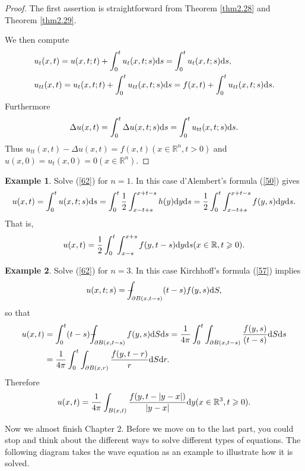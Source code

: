 \documentclass[hyperref,UTF8,12pt]{article}
\numberwithin{equation}{subsection}
\theoremstyle{plain}
\theoremstyle{definition}
\newtheorem{example}{Example}
\numberwithin{theorem}{section}
\numberwithin{lemma}{section}
\numberwithin{proposition}{section}
\numberwithin{remark}{section}
\numberwithin{corollary}{section}
\numberwithin{definition}{section}
\numberwithin{problem}{section}
\numberwithin{example}{section}
\def\dif{\textup{d}}
\def\Xint#1{\mathchoice
	{\XXint\displaystyle\textstyle{#1}}%
	{\XXint\textstyle\scriptstyle{#1}}%
	{\XXint\scriptstyle\scriptscriptstyle{#1}}%
	{\XXint\scriptscriptstyle\scriptscriptstyle{#1}}%
	\!\int}
\def\XXint#1#2#3{{\setbox0=\hbox{$#1{#2#3}{\int}$ }
		\vcenter{\hbox{$#2#3$ }}\kern-.55\wd0}}
\def\dashint{\Xint-}
\newcommand{\ptl}{\partial}
\newcommand{\mr}{\mathbb{R}}
\renewcommand{\geq}{\geqslant}
\begin{document}
\begin{proof}
The first assertion is straightforward from Theorem \ref{thm2.28} and Theorem \ref{thm2.29}.

We then compute\[\begin{aligned}
	&u_t(x,t)=u(x,t;t)+\int_0^tu_t(x,t;s)\dif s=\int_0^tu_t(x,t;s)\dif s,\\
	&u_{tt}(x,t)=u_t(x,t;t)+\int_0^tu_{tt}(x,t;s)\dif s=f(x,t)+\int_0^tu_{tt}(x,t;s)\dif s.
\end{aligned}\]Furthermore
\[\Delta u(x,t)=\int_0^t\Delta u(x,t;s)\dif s=\int_0^tu_{tt}(x,t;s)\dif s.\]Thus
$u_{tt}(x,t)-\Delta u(x,t)=f(x,t)(x\in\mr^n,t>0)$ and $u(x,0)=u_t(x,0)=0(x\in\mr^n)$.
\end{proof}
\begin{example}
Solve (\ref{62}) for $n=1$. In this case d'Alembert's formula (\ref{50}) gives \[u(x,t)=\int_0^tu(x,t;s)\dif s=\int_0^t\frac{1}{2}\int_{x-t+s}^{x+t-s}h(y)\dif y\dif s=\frac{1}{2}\int_0^t\int_{x-t+s}^{x+t-s}f(y,s)\dif y\dif s.\]That is, \[u(x,t)=
\frac{1}{2}\int_0^t\int_{x-s}^{x+s}f(y,t-s)\dif y\dif s(x\in\mr,t\geq0).\]
\end{example}
\begin{example}
Solve (\ref{62}) for $n=3$. In this case Kirchhoff's formula (\ref{57}) implies \[u(x,t;s)=
\dashint_{\ptl B(x,t-s)}(t-s)f(y,s)\dif S,\]so that \[\begin{aligned}
	u(x,t)&=\int_0^t(t-s)\dashint_{\ptl B(x,t-s)}f(y,s)\dif S\dif s=\frac{1}{4\pi}\int_0^t\int_{\ptl B(x,t-s)}\frac{f(y,s)}{(t-s)}\dif S\dif s\\
	&=\frac{1}{4\pi}\int_0^t\int_{\ptl B(x,r)}\frac{f(y,t-r)}{r}\dif S\dif r.
\end{aligned}\]Therefore\[u(x,t)=\frac{1}{4 \pi}\int_{B(x,t)}\frac{f(y,t-|y-x|)}{|y-x|}\dif y
(x\in\mr^3,t\geq0).\]
\end{example}

Now we almost finish Chapter 2. Before we move on to the last part, you could stop and think about the different ways to solve different types of equations. The following diagram takes the wave equation as an example to illustrate how it is solved.
\end{document}
